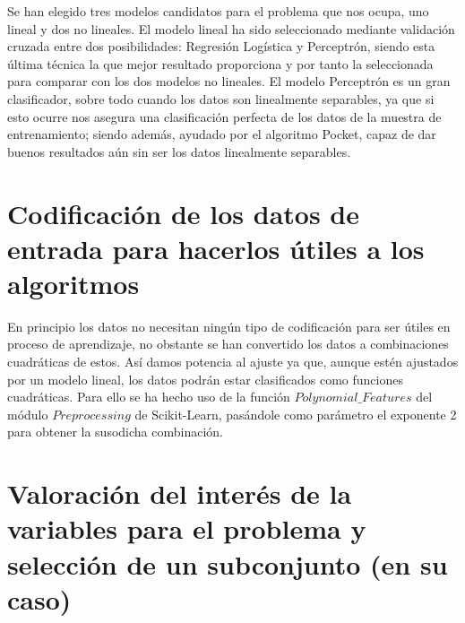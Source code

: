 \documentclass{article}
\begin{document}
	Se han elegido tres modelos candidatos para el problema que nos ocupa, uno lineal y dos no lineales. El modelo lineal ha sido seleccionado mediante validación cruzada entre dos posibilidades: Regresión Logística y Perceptrón, siendo esta última técnica la que mejor resultado proporciona y por tanto la seleccionada para comparar con los dos modelos no lineales. El modelo Perceptrón es un gran clasificador, sobre todo cuando los datos son linealmente separables, ya que si esto ocurre nos asegura una clasificación perfecta de los datos de la muestra de entrenamiento; siendo además, ayudado por el algoritmo Pocket, capaz de dar buenos resultados aún sin ser los datos linealmente separables.
	
	
	
	\section{Codificación de los datos de entrada para hacerlos útiles a los algoritmos} %
	
	
	En principio los datos no necesitan ningún tipo de codificación para ser útiles en proceso de aprendizaje, no obstante se han convertido los datos a combinaciones cuadráticas de estos. Así damos potencia al ajuste ya que, aunque estén ajustados por un modelo lineal, los datos podrán estar clasificados como funciones cuadráticas. Para ello se ha hecho uso de la función $Polynomial\_Features$ del módulo $Preprocessing$ de Scikit-Learn, pasándole como parámetro el exponente 2 para obtener la susodicha combinación.
	
	
	\section{Valoración del interés de la variables para el problema y selección de un subconjunto (en su caso)} %
	
\end{document}
